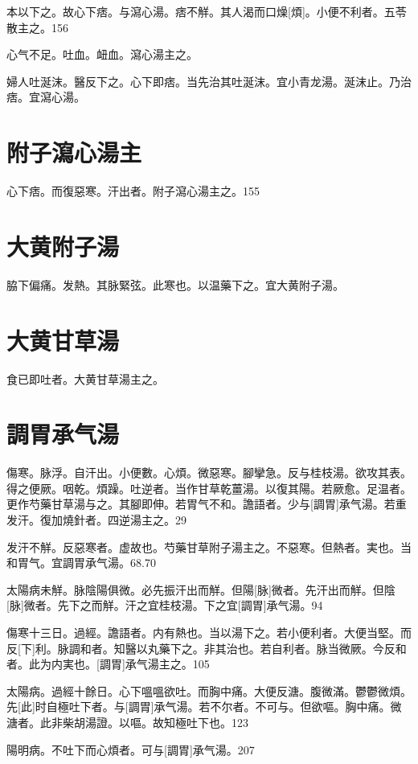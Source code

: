 \documentclass[12pt,oneside,UTF8,b5paper]{ctexbook}她她她她她她她
\begin{document}
本以下之。故心下痞。与瀉心湯。痞不觧。其人渴而口燥[煩]。小便不利者。五苓散主之。156

心气不足。吐血。衄血。瀉心湯主之。

婦人吐涎沫。醫反下之。心下即痞。当先治其吐涎沫。宜小青龙湯。涎沫止。乃治痞。宜瀉心湯。

\section{附子瀉心湯主}

心下痞。而復惡寒。汗出者。附子瀉心湯主之。155

\section{大黄附子湯}

脇下偏痛。发熱。其脉緊弦。此寒也。以温藥下之。宜大黄附子湯。

\section{大黄甘草湯}

食已即吐者。大黄甘草湯主之。

\section{調胃承气湯}

傷寒。脉浮。自汗出。小便數。心煩。微惡寒。腳攣急。反与桂枝湯。欲攻其表。得之便厥。咽乾。煩躁。吐逆者。当作甘草乾薑湯。以復其陽。若厥愈。足温者。更作芍藥甘草湯与之。其腳即伸。若胃气不和。譫語者。少与[調胃]承气湯。若重发汗。復加燒針者。四逆湯主之。29

发汗不觧。反惡寒者。虚故也。芍藥甘草附子湯主之。不惡寒。但熱者。実也。当和胃气。宜調胃承气湯。68.70

太陽病未觧。脉陰陽俱微。必先振汗出而觧。但陽[脉]微者。先汗出而觧。但陰[脉]微者。先下之而觧。汗之宜桂枝湯。下之宜[調胃]承气湯。94

傷寒十三日。過經。譫語者。内有熱也。当以湯下之。若小便利者。大便当堅。而反[下]利。脉調和者。知醫以丸藥下之。非其治也。若自利者。脉当微厥。今反和者。此为内実也。[調胃]承气湯主之。105

太陽病。過經十餘日。心下嗢嗢欲吐。而胸中痛。大便反溏。腹微滿。鬱鬱微煩。先[此]时自極吐下者。与[調胃]承气湯。若不尔者。不可与。但欲嘔。胸中痛。微溏者。此非柴胡湯證。以嘔。故知極吐下也。123

陽明病。不吐下而心煩者。可与[調胃]承气湯。207
\end{document}
